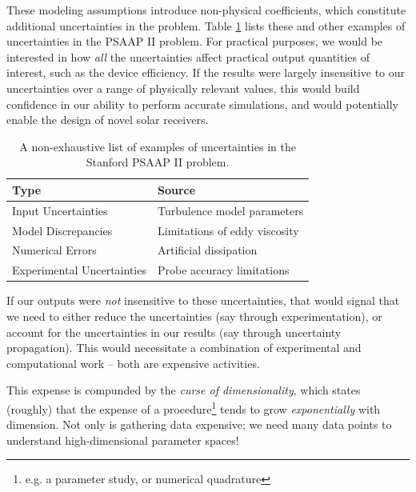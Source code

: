 \documentclass[../primer.tex]{subfiles}
\begin{document}

\clearpage

These modeling assumptions introduce non-physical coefficients, which constitute
additional uncertainties in the problem. Table \ref{tab:uncertainties} lists
these and other examples of uncertainties in the PSAAP II problem. For practical
purposes, we would be interested in how \emph{all} the uncertainties affect practical
output quantities of interest, such as the device efficiency. If the results
were largely insensitive to our uncertainties over a range of physically
relevant values, this would build confidence in our ability to perform accurate
simulations, and would potentially enable the design of novel solar receivers.

\begin{table}[!ht]
\caption{A non-exhaustive list of examples of uncertainties
in the Stanford PSAAP II problem.}
\label{tab:uncertainties}
\begin{tabular}{@{}ll@{}}
Type                       & Source                        \\
\hline
Input Uncertainties        & Turbulence model parameters   \\
Model Discrepancies        & Limitations of eddy viscosity \\
Numerical Errors           & Artificial dissipation        \\
Experimental Uncertainties & Probe accuracy limitations    \\
\end{tabular}
\end{table}

If our outputs were \emph{not} insensitive to these uncertainties, that would signal
that we need to either reduce the uncertainties (say through experimentation),
or account for the uncertainties in our results (say through uncertainty
propagation). This would necessitate a combination of experimental and
computational work -- both are expensive activities.

This expense is compunded by the \emph{curse of dimensionality}, which states
(roughly) that the expense of a procedure\footnote{e.g. a parameter study, or
numerical quadrature} tends to grow \emph{exponentially} with dimension. Not only is
gathering data expensive; we need many data points to understand
high-dimensional parameter spaces!
\end{document}
